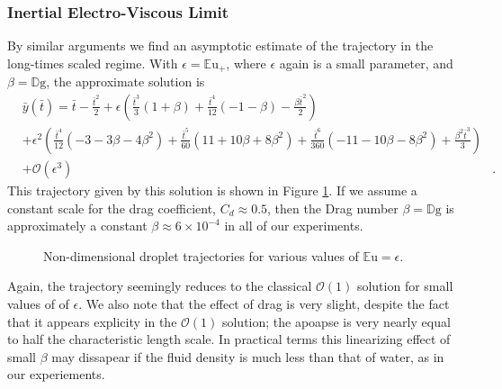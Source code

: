 \documentclass[a4paper, 12pt]{article}
\begin{document}
\subsubsection{Inertial Electro-Viscous Limit}

By similar arguments we find an asymptotic estimate of the trajectory in the long-times scaled regime. With $\epsilon = {\mathbb{E}\mbox{u}}_+$, where $\epsilon$ again is a small parameter, and $\beta = \mathbb{D}\mbox{g}$, the approximate solution is 
\begin{eqnarray*}
&\bar{y}(\bar{t}) = \bar{t} - \frac{\bar{t}^{2}}{2} + \epsilon \left(\frac{\bar{t}^{3}}{3} \left(1 + \beta\right) + \frac{\bar{t}^{4}}{12} \left(-1 - \beta\right) - \frac{\beta \bar{t}^{2}}{2}\right)&  \\
&+ \epsilon^{2} \left(\frac{\bar{t}^{4}}{12} \left(-3 - 3 \beta - 4 \beta^{2}\right) + \frac{\bar{t}^{5}}{60} \left(11 + 10 \beta + 8 \beta^{2}\right)+ \frac{\bar{t}^{6}}{360} \left(-11 - 10 \beta - 8 \beta^{2}\right) + \frac{\beta^{2} \bar{t}^{3}}{3}\right)& \\
 &+ \mathcal{O}(\epsilon^3)&.
\end{eqnarray*}
This trajectory given by this solution is shown in Figure \ref{fig:long_times}. If we assume a constant scale for the drag coefficient, $C_d \approx 0.5$, then  the Drag number $\beta = \mathbb{D}\mbox{g}$ is approximately a constant $\beta \approx 6 \times 10^{-4}$ in all of our experiments.
\begin{figure}[htb]
    \centering
    
    \caption{Non-dimensional droplet trajectories for various values of $\mathbb{E}\mbox{u}=\epsilon$.}
     \label{fig:long_times}
\end{figure}
Again, the trajectory seemingly reduces to the classical $\mathcal{O}(1)$ solution for small values of of $\epsilon$. We also note that the effect of drag is very slight, despite the fact that it appears explicity in the $\mathcal{O}(1)$ solution; the apoapse is very nearly equal to half the characteristic length scale. In practical terms this linearizing effect of small $\beta$ may dissapear if the fluid density is much less than that of water, as in our experiements.
 
\end{document}
